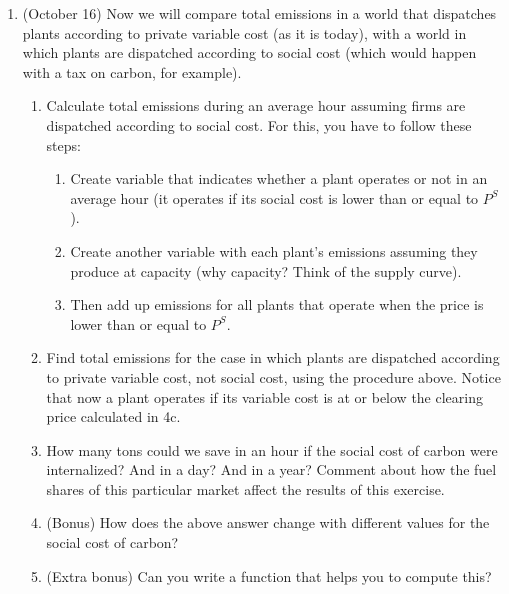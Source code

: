 \documentclass[11pt]{article}
\begin{document}
\begin{enumerate}
	\item (October 16) Now we will compare total emissions in a world that dispatches plants according to private variable cost (as it is today), with a world in which plants are dispatched according to social cost (which would happen with a tax on carbon, for example).
	\begin{enumerate}
	\item Calculate total emissions during an average hour assuming firms are dispatched according to social cost. For this, you have to follow these steps:
		\begin{enumerate}
		\item Create variable that indicates whether a plant operates or not in an average hour (it operates if its social cost is lower than or equal to $P^S$). 
		\item Create another variable with each plant's emissions assuming they produce at capacity (why capacity? Think of the supply curve). 
		\item Then add up emissions for all plants that operate when the price is lower than or equal to $P^S$.
		\end{enumerate}
	\item Find total emissions for the case in which plants are dispatched according to private variable cost, not social cost, using the procedure above. Notice that now a plant operates if its variable cost is at or below the clearing price calculated in 4c.
	\item How many tons could we save in an hour if the social cost of carbon were internalized? And in a day? And in a year? Comment about how the fuel shares of this particular market affect the results of this exercise.
	\item (Bonus) How does the above answer change with different values for the social cost of carbon? 
	\item (Extra bonus) Can you write a function that helps you to compute this?
		\end{enumerate}



	
\end{enumerate}
\end{document}
